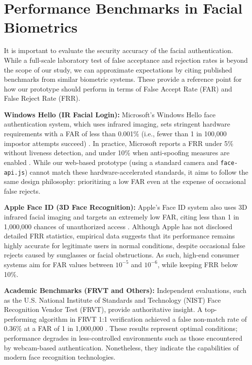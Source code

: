 \section{Performance Benchmarks in Facial Biometrics}

It is important to evaluate the security accuracy of the facial authentication. While a full-scale laboratory test of false acceptance and rejection rates is beyond the scope of our study, we can approximate expectations by citing published benchmarks from similar biometric systems. These provide a reference point for how our prototype should perform in terms of False Accept Rate (FAR) and False Reject Rate (FRR).

\textbf{Windows Hello (IR Facial Login):} Microsoft’s Windows Hello face authentication system, which uses infrared imaging, sets stringent hardware requirements with a FAR of less than 0.001\% (i.e., fewer than 1 in 100{,}000 impostor attempts succeed) \autocite{MicrosoftHelloDocs}. In practice, Microsoft reports a FRR under 5\% without liveness detection, and under 10\% when anti-spoofing measures are enabled \autocite{MicrosoftHelloDocs}. While our web-based prototype (using a standard camera and \texttt{face-api.js}) cannot match these hardware-accelerated standards, it aims to follow the same design philosophy: prioritizing a low FAR even at the expense of occasional false rejects.

\textbf{Apple Face ID (3D Face Recognition):} Apple’s Face ID system also uses 3D infrared facial imaging and targets an extremely low FAR, citing less than 1 in 1{,}000{,}000 chances of unauthorized access \autocite{BentoFaceID}. Although Apple has not disclosed detailed FRR statistics, empirical data suggests that its performance remains highly accurate for legitimate users in normal conditions, despite occasional false rejects caused by sunglasses or facial obstructions. As such, high-end consumer systems aim for FAR values between $10^{-5}$ and $10^{-6}$, while keeping FRR below 10\%.

\textbf{Academic Benchmarks (FRVT and Others):} Independent evaluations, such as the U.S. National Institute of Standards and Technology (NIST) Face Recognition Vendor Test (FRVT), provide authoritative insight. A top-performing algorithm in FRVT 1:1 verification achieved a false non-match rate of 0.36\% at a FAR of 1 in 1{,}000{,}000 \autocite{ParavisionFRVT}. These results represent optimal conditions; performance degrades in less-controlled environments such as those encountered by webcam-based authentication. Nonetheless, they indicate the capabilities of modern face recognition technologies.

